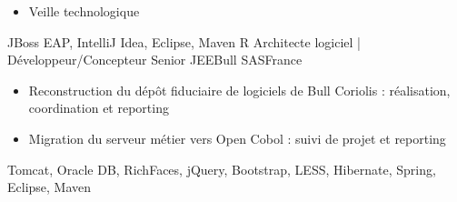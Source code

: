 \begin{experiences}
{\begin{itemize}
                        \item Veille technologique                                                                    
                      \end{itemize}
                    }
                    {JBoss EAP, IntelliJ Idea, Eclipse, Maven}
  \emptySeparator
  \experience
    {R}             {Architecte logiciel | Développeur/Concepteur Senior JEE}{Bull SAS}{France}
    {}              {
                      \begin{itemize}
                        \item Reconstruction du dépôt fiduciaire de logiciels de Bull Coriolis : réalisation, coordination et reporting
                        \item Migration du serveur métier vers Open Cobol : suivi de projet et reporting                
                                        
                      \end{itemize}
                    }
                    {Tomcat, Oracle DB, RichFaces, jQuery, Bootstrap, LESS, Hibernate, Spring, Eclipse, Maven}
  \emptySeparator
  
 
\end{experiences}
